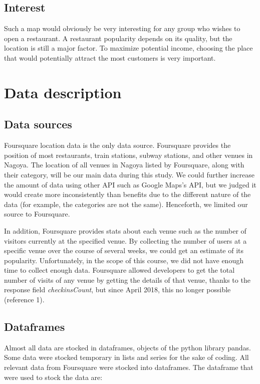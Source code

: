 \documentclass[12pt,a4paper]{article}
\begin{document}
\subsection{Interest}

Such a map would obviously be very interesting for any group who wishes to open a restaurant. A restaurant popularity depends on its quality, but the location is still a major factor. To maximize potential income, choosing the place that would potentially attract the most customers is very important.

\section{Data description}

\subsection{Data sources}

Foursquare location data is the only data source. Foursquare provides the position of most restaurants, train stations, subway stations, and other venues in Nagoya. The location of all venues in Nagoya listed by Foursquare, along with their category, will be our main data during this study. We could further increase the amount of data using other API such as Google Maps's API, but we judged it would create more inconsistently than benefits due to the different nature of the data (for example, the categories are not the same). Henceforth, we limited our source to Foursquare.

\medskip

In addition, Foursquare provides stats about each venue such as the number of visitors currently at the specified venue. By collecting the number of users at a specific venue over the course of several weeks, we could get an estimate of its popularity. Unfortunately, in the scope of this course, we did not have enough time to collect enough data.  Foursquare allowed developers to get the total number of visits of any venue by getting the details of that venue, thanks to the response field \textit{checkinsCount}, but since April 2018, this no longer possible (reference 1).

\subsection{Dataframes}

Almost all data are stocked in dataframes, objects of the python library pandas. Some data were stocked temporary in lists and series for the sake of coding.
All relevant data from Foursquare were stocked into dataframes. The dataframe that were used to stock the data are:
\end{document}
